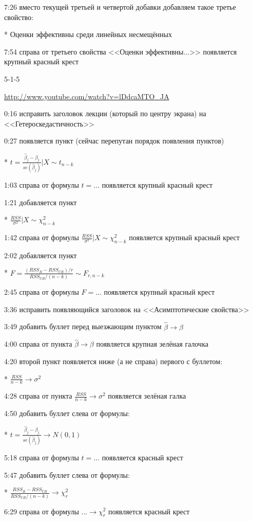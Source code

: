 \documentclass[12pt,a4paper]{article}
\renewcommand{\b}{\beta}
\newcommand{\hb}{\hat{\b}}
\begin{document}
7:26 вместо текущей третьей и четвертой добавки добавляем такое третье свойство:

* Оценки эффективны среди линейных несмещённых

7:54 справа от третьего свойства <<Оценки эффективны...>> появляется крупный красный крест

5-1-5

\url{http://www.youtube.com/watch?v=lDdcaMTO_JA}


0:16 исправить заголовок лекции (который по центру экрана) на <<Гетероскедастичность>>

0:27 появляется пункт (сейчас перепутан порядок появления пунктов)

* $t=\frac{\hat{\beta}_j-\beta_j}{se(\hat{\beta}_j)} | X \sim t_{n-k}$

1:03 справа от формулы $t=...$ появляется крупный красный крест

1:21 добавляется пункт

* $\frac{RSS}{\sigma^2} |X \sim \chi^2_{n-k}$

1:42 справа от формулы $\frac{RSS}{\sigma^2} |X \sim \chi^2_{n-k}$ появляется крупный красный крест

2:02 добавляется пункт

* $F=\frac{(RSS_R-RSS_{UR})/r}{RSS_{UR}/(n-k)} \sim F_{r,n-k}$

2:45 справа от формулы $F=...$ появляется крупный красный крест

3:36 исправить появляющийся заголовок на <<Асимптотические свойства>>

3:49 добавить буллет перед выезжающим пунктом $\hb \to \beta$

4:00 справа от пункта $\hb \to \beta$ появляется крупная зелёная галочка

4:20 второй пункт появляется ниже (а не справа) первого с буллетом:

* $\frac{RSS}{n-k} \to \sigma^2$

4:28 справа от пункта $\frac{RSS}{n-k} \to \sigma^2$ появляется зелёная галка

4:50 добавить буллет слева от формулы:

* $t=\frac{\hat{\beta}_j-\beta_j}{se(\hat{\beta}_j)} \to N(0,1)$

5:18 справа от формулы $t=...$ появляется красный крест

5:47 добавить буллет слева от формулы:

* $\frac{RSS_R-RSS_{UR}}{RSS_{UR}/(n-k)} \to \chi^2_r$

6:29 справа от формулы $... \to \chi^2_r$ появляется красный крест
\end{document}
